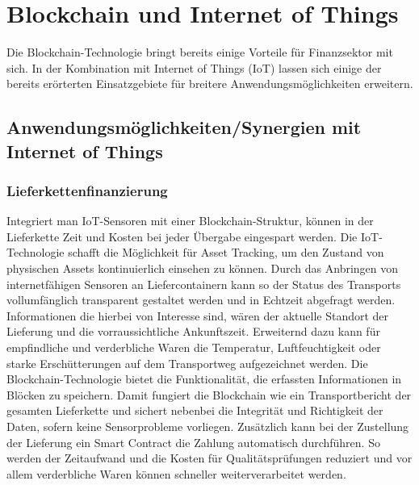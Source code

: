 \section{Blockchain und Internet of Things}
Die Blockchain-Technologie bringt bereits einige Vorteile für Finanzsektor mit sich.
In der Kombination mit Internet of Things (IoT) lassen sich einige der bereits erörterten Einsatzgebiete
für breitere Anwendungsmöglichkeiten erweitern.

\subsection{Anwendungsmöglichkeiten/Synergien mit Internet of Things}

\subsubsection{Lieferkettenfinanzierung}
Integriert man IoT-Sensoren mit einer Blockchain-Struktur, können in der Lieferkette Zeit und Kosten bei
jeder Übergabe eingespart werden.
Die IoT-Technologie schafft die Möglichkeit für Asset Tracking, um den Zustand von physischen Assets
kontinuierlich einsehen zu können. Durch das Anbringen von internetfähigen Sensoren an 
Liefercontainern kann so der Status des Transports vollumfänglich transparent gestaltet
werden und in Echtzeit abgefragt werden. 
Informationen die hierbei von Interesse sind, wären der aktuelle Standort der Lieferung und
die vorraussichtliche Ankunftszeit. Erweiternd dazu kann für empfindliche und 
verderbliche Waren die Temperatur, Luftfeuchtigkeit oder starke Erschütterungen auf dem 
Transportweg aufgezeichnet werden.
Die Blockchain-Technologie bietet die Funktionalität, die erfassten Informationen in Blöcken
zu speichern. Damit fungiert die Blockchain wie ein Transportbericht der gesamten Lieferkette und 
sichert nebenbei die Integrität und Richtigkeit der Daten, sofern keine Sensorprobleme vorliegen. 
Zusätzlich kann bei der Zustellung der Lieferung ein Smart Contract die Zahlung automatisch durchführen.
So werden der Zeitaufwand und die Kosten für Qualitätsprüfungen reduziert und vor allem verderbliche 
Waren können schneller weiterverarbeitet werden.
\cite[p.~169f]{chowdhary2025smart}


